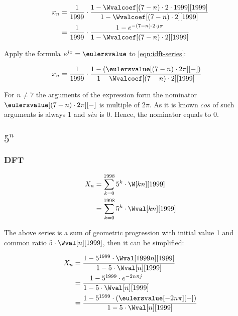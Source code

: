 \documentclass[a4paper]{article}
\theoremstyle{break}
\theoremstyle{break}
\begin{document}
\begin{equation} \label{eqn:idft-series}
  \begin{split}
    x_n &= \frac{1}{1999} \cdot
           \frac{1 - \Wvalcoef[(7 - n) \cdot 2 \cdot 1999][1999]}{1 - \Wvalcoef[(7 - n) \cdot 2][1999]} \\
        &= \frac{1}{1999} \cdot
           \frac{1 - e^{-(7 - n) \cdot 2 \cdot j \pi}}{1 - \Wvalcoef[(7 - n) \cdot 2][1999]}
  \end{split}
\end{equation}

Apply the formula $e^{jx} = \eulersvalue$ to \eqref{eqn:idft-series}:

\begin{equation*}
  \begin{split}
    x_n &= \frac{1}{1999} \cdot
           \frac{1 - (\eulersvalue[(7 - n) \cdot 2 \pi][-])}{1 - \Wvalcoef[(7 - n) \cdot 2][1999]}
  \end{split}
\end{equation*}

For $n \neq 7$ the arguments of the expression form the nominator $\eulersvalue[(7 - n) \cdot 2 \pi][-]$ is multiple of $2\pi$. As it is known $cos$ of such arguments is always 1 and $sin$ is 0. Hence, the nominator equals to 0.


\subsection{$5^n$}

\subsubsection{DFT}

\begin{equation*}
  \begin{split}
    X_n &= \sum_{k = 0}^{1998} 5^k \cdot \W[kn][1999] \\
        &= \sum_{k = 0}^{1998} 5^k \cdot \Wval[kn][1999]
  \end{split}
\end{equation*}

The above series is a sum of geometric progression with initial value 1 and common ratio $5 \cdot \Wval[n][1999]$, then it can be simplified:

\begin{equation*}
  \begin{split}
    X_n &= \frac{1 - 5^{1999} \cdot \Wval[1999n][1999]}
                {1 - 5 \cdot \Wval[n][1999]} \\
        &= \frac{1 - 5^{1999} \cdot e^{-2 n \pi j}}
                {1 - 5 \cdot \Wval[n][1999]} \\
        &= \frac{1 - 5^{1999} \cdot (\eulersvalue[-2 n \pi][-])}
                {1 - 5 \cdot \Wval[n][1999]}
  \end{split}
\end{equation*}
\end{document}
